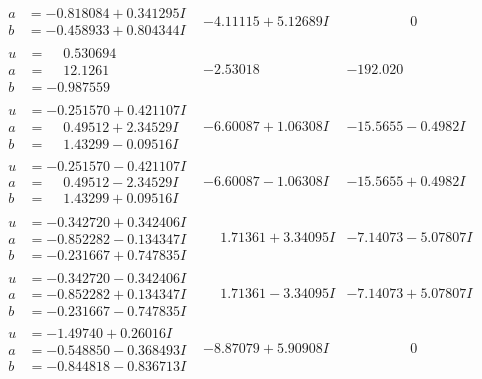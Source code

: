 \documentclass[1p]{elsarticle_modified}
\theoremstyle{definition}
\begin{document}
$$\begin{array}{c|c|c}
\begin{aligned}
a &= -0.818084 + 0.341295 I \\
b &= -0.458933 + 0.804344 I\end{aligned}
 & -4.11115 + 5.12689 I & \phantom{-0.000000 } 0 \\ \hline\begin{aligned}
u &= \phantom{-}0.530694\phantom{ +0.000000I} \\
a &= \phantom{-}12.1261\phantom{ +0.000000I} \\
b &= -0.987559\phantom{ +0.000000I}\end{aligned}
 & -2.53018\phantom{ +0.000000I} & -192.020\phantom{ +0.000000I} \\ \hline\begin{aligned}
u &= -0.251570 + 0.421107 I \\
a &= \phantom{-}0.49512 + 2.34529 I \\
b &= \phantom{-}1.43299 - 0.09516 I\end{aligned}
 & -6.60087 + 1.06308 I & -15.5655 - 0.4982 I \\ \hline\begin{aligned}
u &= -0.251570 - 0.421107 I \\
a &= \phantom{-}0.49512 - 2.34529 I \\
b &= \phantom{-}1.43299 + 0.09516 I\end{aligned}
 & -6.60087 - 1.06308 I & -15.5655 + 0.4982 I \\ \hline\begin{aligned}
u &= -0.342720 + 0.342406 I \\
a &= -0.852282 - 0.134347 I \\
b &= -0.231667 + 0.747835 I\end{aligned}
 & \phantom{-}1.71361 + 3.34095 I & -7.14073 - 5.07807 I \\ \hline\begin{aligned}
u &= -0.342720 - 0.342406 I \\
a &= -0.852282 + 0.134347 I \\
b &= -0.231667 - 0.747835 I\end{aligned}
 & \phantom{-}1.71361 - 3.34095 I & -7.14073 + 5.07807 I \\ \hline\begin{aligned}
u &= -1.49740 + 0.26016 I \\
a &= -0.548850 - 0.368493 I \\
b &= -0.844818 - 0.836713 I\end{aligned}
 & -8.87079 + 5.90908 I & \phantom{-0.000000 } 0\\

\end{array}$$
\end{document}
